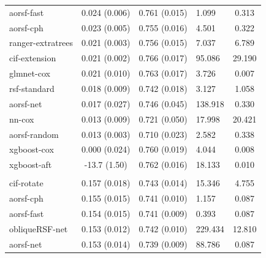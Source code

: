 \documentclass[twoside,11pt]{article}\usepackage[]{graphicx}\usepackage[]{xcolor}
\newenvironment{knitrout}{}{} %
\begin{document}
\begin{knitrout}
\begin{longtable}[t]{lcclc}
\hspace{1em}aorsf-fast & 0.024 (0.006) & 0.761 (0.015) & 1.099 & 0.313\\
\hspace{1em}aorsf-cph & 0.023 (0.005) & 0.755 (0.016) & 4.501 & 0.322\\
\hspace{1em}ranger-extratrees & 0.021 (0.003) & 0.756 (0.015) & 7.037 & 6.789\\
\hspace{1em}cif-extension & 0.021 (0.002) & 0.766 (0.017) & 95.086 & 29.190\\
\hspace{1em}glmnet-cox & 0.021 (0.010) & 0.763 (0.017) & 3.726 & 0.007\\
\hspace{1em}rsf-standard & 0.018 (0.009) & 0.742 (0.018) & 3.127 & 1.058\\
\hspace{1em}aorsf-net & 0.017 (0.027) & 0.746 (0.045) & 138.918 & 0.330\\
\hspace{1em}nn-cox & 0.013 (0.009) & 0.721 (0.050) & 17.998 & 20.421\\
\hspace{1em}aorsf-random & 0.013 (0.003) & 0.710 (0.023) & 2.582 & 0.338\\
\hspace{1em}xgboost-cox & 0.000 (0.024) & 0.760 (0.019) & 4.044 & 0.008\\
\hspace{1em}xgboost-aft & -13.7 (1.50) & 0.762 (0.016) & 18.133 & 0.010\\
\addlinespace[0.3em]
\hline
\multicolumn{5}{l}{\textit{\textbf{Monoclonal gammopathy; death, n = 1384, p = 8}}}\\
\hline
\hspace{1em}cif-rotate & 0.157 (0.018) & 0.743 (0.014) & 15.346 & 4.755\\
\hspace{1em}aorsf-cph & 0.155 (0.015) & 0.741 (0.010) & 1.157 & 0.087\\
\hspace{1em}aorsf-fast & 0.154 (0.015) & 0.741 (0.009) & 0.393 & 0.087\\
\hspace{1em}obliqueRSF-net & 0.153 (0.012) & 0.742 (0.010) & 229.434 & 12.810\\
\hspace{1em}aorsf-net & 0.153 (0.014) & 0.739 (0.009) & 88.786 & 0.087\\

\end{longtable}
\end{knitrout}
\end{document}
